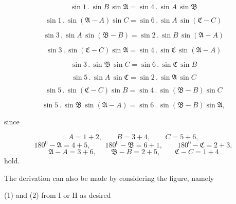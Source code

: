 \begin{equation}
\sin 1 \, . \, \sin B \, \sin\mathfrak{A} = \sin 4 \, . \, \sin A \, \sin\mathfrak{B}
\tag{4}
\end{equation}

\begin{equation}
\sin 1 \, . \, \sin(\mathfrak{A}-A)\sin C = \sin 6 \, . \, \sin A \, \sin(\mathfrak{C}-C)
\tag{5}
\end{equation}

\begin{equation}
\sin 3 \, . \, \sin A \, \sin(\mathfrak{B}-B) = \sin 2 \, . \, \sin B \, \sin(\mathfrak{A}-A)
\tag{6}
\end{equation}

\begin{equation}
\sin 3 \, . \, \sin(\mathfrak{C}-C)\sin\mathfrak{A} = \sin 4 \, . \, \sin\mathfrak{C} \, \sin(\mathfrak{A}-A)
\tag{7}
\end{equation}

\begin{equation}
\sin 3 \, . \, \sin\mathfrak{B} \, \sin C = \sin 6 \, . \, \sin\mathfrak{C} \, \sin B
\tag{8}
\end{equation}

\begin{equation}
\sin 5 \, . \, \sin A \, \sin\mathfrak{C} = \sin 2 \, . \, \sin\mathfrak{A} \, \sin C
\tag{9}
\end{equation}

\begin{equation}
\sin 5 \, . \, \sin(\mathfrak{C}-C)\sin B = \sin 4 \, . \, \sin(\mathfrak{B}-B)\sin C
\tag{10}
\end{equation}

\begin{equation}
\sin 5 \, . \, \sin\mathfrak{B} \, \sin(\mathfrak{A}-A) = \sin 6 \, . \, \sin(\mathfrak{B}-B)\sin\mathfrak{A},
\tag{11}
\end{equation}

since

\[
A=1+2, \qquad B=3+4, \qquad C=5+6,
\]
\[
180^0-\mathfrak{A}=4+5, \qquad 180^0-\mathfrak{B}=6+1, \qquad 180^0-\mathfrak{C}=2+3,
\]
\[
\mathfrak{A}-A=3+6, \qquad \mathfrak{B}-B=2+5, \qquad \mathfrak{C}-C=1+4
\]
hold.

The derivation can also be made by considering the figure, namely
\begin{center}(1) and (2) from I or II as desired\end{center}
